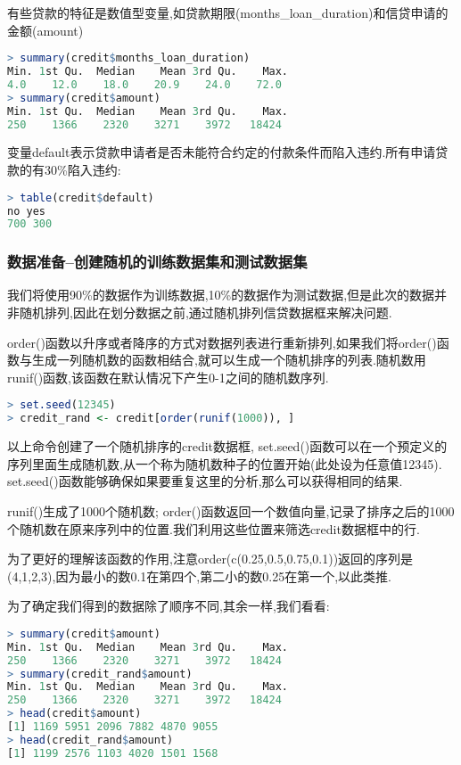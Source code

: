 \documentclass[11pt,a4paper,oneside]{book}
\begin{document}
有些贷款的特征是数值型变量,如贷款期限(months\_loan\_duration)和信贷申请的金额(amount)
\begin{lstlisting}[language=r]
> summary(credit$months_loan_duration)
Min. 1st Qu.  Median    Mean 3rd Qu.    Max. 
4.0    12.0    18.0    20.9    24.0    72.0 
> summary(credit$amount)
Min. 1st Qu.  Median    Mean 3rd Qu.    Max. 
250    1366    2320    3271    3972   18424 
\end{lstlisting}

变量default表示贷款申请者是否未能符合约定的付款条件而陷入违约.所有申请贷款的有30\%陷入违约:
\begin{lstlisting}[language=r]
> table(credit$default)
no yes 
700 300
\end{lstlisting}
\subsubsection{数据准备--创建随机的训练数据集和测试数据集}
我们将使用90\%的数据作为训练数据,10\%的数据作为测试数据,但是此次的数据并非随机排列,因此在划分数据之前,通过随机排列信贷数据框来解决问题.

order()函数以升序或者降序的方式对数据列表进行重新排列,如果我们将order()函数与生成一列随机数的函数相结合,就可以生成一个随机排序的列表.随机数用runif()函数,该函数在默认情况下产生0-1之间的随机数序列.
\begin{lstlisting}[language=r]
> set.seed(12345)
> credit_rand <- credit[order(runif(1000)), ]
\end{lstlisting}
以上命令创建了一个随机排序的credit数据框, set.seed()函数可以在一个预定义的序列里面生成随机数,从一个称为随机数种子的位置开始(此处设为任意值12345). set.seed()函数能够确保如果要重复这里的分析,那么可以获得相同的结果.

runif()生成了1000个随机数; order()函数返回一个数值向量,记录了排序之后的1000个随机数在原来序列中的位置.我们利用这些位置来筛选credit数据框中的行.
\begin{tcolorbox}[colback=pink!10!white,colframe=pink!100!black]
为了更好的理解该函数的作用,注意order(c(0.25,0.5,0.75,0.1))返回的序列是(4,1,2,3),因为最小的数0.1在第四个,第二小的数0.25在第一个,以此类推.
\end{tcolorbox}
为了确定我们得到的数据除了顺序不同,其余一样,我们看看:
\begin{lstlisting}[language=r]
> summary(credit$amount)
Min. 1st Qu.  Median    Mean 3rd Qu.    Max. 
250    1366    2320    3271    3972   18424 
> summary(credit_rand$amount)
Min. 1st Qu.  Median    Mean 3rd Qu.    Max. 
250    1366    2320    3271    3972   18424 
> head(credit$amount)
[1] 1169 5951 2096 7882 4870 9055
> head(credit_rand$amount)
[1] 1199 2576 1103 4020 1501 1568
\end{lstlisting}
\end{document}
